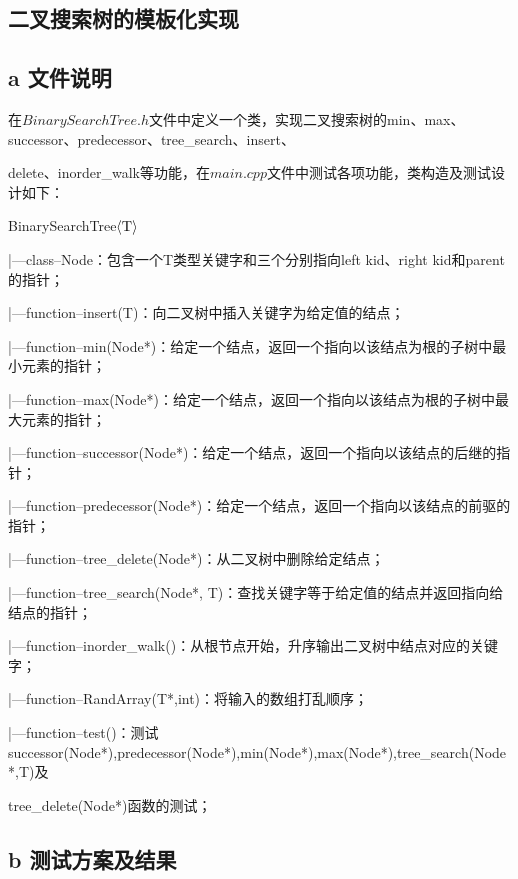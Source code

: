 \documentclass[twoside,a4paper]{article}
\begin{document}
\begin{CJK*}{UTF8}{gkai}

\pagestyle{fancy}
\fancyhead{}


\section*{ 二叉搜索树的模板化实现}

\subsection*{a 文件说明}
在$BinarySearchTree.h$文件中定义一个类，实现二叉搜索树的min、max、successor、predecessor、tree\_search、insert、

\noindent delete、inorder\_walk等功能，在$main.cpp$文件中测试各项功能，类构造及测试设计如下：

BinarySearchTree$\left< \rm{T} \right> $

    |---class--Node：包含一个T类型关键字和三个分别指向left kid、right kid和parent的指针；
    
    |---function--insert(T)：向二叉树中插入关键字为给定值的结点；
    
    |---function--min(Node*)：给定一个结点，返回一个指向以该结点为根的子树中最小元素的指针；
    
    |---function--max(Node*)：给定一个结点，返回一个指向以该结点为根的子树中最大元素的指针；
    
    |---function--successor(Node*)：给定一个结点，返回一个指向以该结点的后继的指针；
    
    |---function--predecessor(Node*)：给定一个结点，返回一个指向以该结点的前驱的指针；

    |---function--tree\_delete(Node*)：从二叉树中删除给定结点；
    
    |---function--tree\_search(Node*, T)：查找关键字等于给定值的结点并返回指向给结点的指针；

    |---function--inorder\_walk()：从根节点开始，升序输出二叉树中结点对应的关键字；

    |---function--RandArray(T*,int)：将输入的数组打乱顺序；
    
    |---function--test()：测试successor(Node*),predecessor(Node*),min(Node*),max(Node*),tree\_search(Node*,T)及

    tree\_delete(Node*)函数的测试；

\subsection*{b 测试方案及结果}


\end{CJK*}
\end{document}
